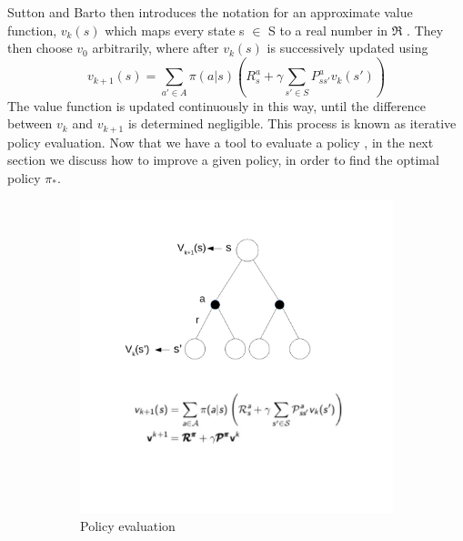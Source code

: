 Sutton and Barto then introduces the notation for an approximate value function, $v_{k}(s)$ which maps every state s $\in$ S to a real number in $\Re$ \cite{sutton_barto}. They then choose $v_0$ arbitrarily, where after $v_{k}(s)$ is successively updated using
\begin{equation}
		v_{k+1}(s) = \sum_{a'\in A}\pi(a|s)(R^{a}_s+\gamma\sum_{s'\in S}P^{a}_{ss'}v_k(s'))
\end{equation}
The value function is updated continuously in this way, until the difference between $v_{k}$ and $v_{k+1}$ is determined negligible. This process is known as iterative policy evaluation.
Now that we have a tool to evaluate a policy , in the next section we discuss how to improve a given policy, in order to find the optimal policy $\pi_{*}$.
\begin{figure}[!htb]
	\centering
	\begin{subfigure}{.49\textwidth}
		\centering
		\includegraphics[width=1\linewidth]{MDP/fig/Iterative_Policy_Evaluation.pdf}
		\caption{Policy evaluation\cite{David_Silver}}
		\label{fig:iterative_policy_evaluation}
	\end{subfigure}
	\begin{subfigure}{.49\textwidth}
		\centering

\end{subfigure}
\end{figure}
